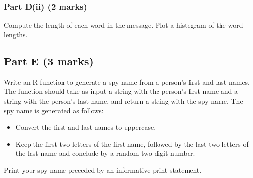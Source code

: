 \documentclass[
]{article}
\providecommand{\tightlist}{%
  \setlength{\itemsep}{0pt}\setlength{\parskip}{0pt}}
\begin{document}
\subsubsection{Part D(ii) (2 marks)}\label{part-dii-2-marks}

Compute the length of each word in the message. Plot a histogram of the
word lengths.

\subsection{Part E (3 marks)}\label{part-e-3-marks}

Write an R function to generate a spy name from a person's first and
last names. The function should take as input a string with the person's
first name and a string with the person's last name, and return a string
with the spy name. The spy name is generated as follows:

\begin{itemize}
\tightlist
\item
  Convert the first and last names to uppercase.
\item
  Keep the first two letters of the first name, followed by the last two
  letters of the last name and conclude by a random two-digit number.
\end{itemize}

Print your spy name preceded by an informative print statement.
\end{document}
